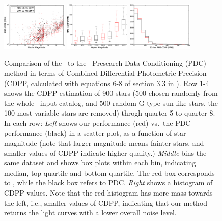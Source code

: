 \begin{figure}[p]
\begin{center}
\includegraphics[width=0.28\textwidth]{figures/cpm/f6j}
\includegraphics[width=0.28\textwidth]{figures/cpm/f6k}
\includegraphics[width=0.28\textwidth]{figures/cpm/f6l}
\end{center}
\caption[The \name\ photometric precisson]{
  \label{cdpp} 
  Comparison of the \name\ to the \Kepler\ Presearch Data Conditioning (PDC) method in terms of Combined Differential Photometric Precision (CDPP, calculated with equations 6-8 of section 3.3 in \citealt{cdpp1}).
  Row 1-4 shows the CDPP estimation of 900 stars (500 chosen randomly from the whole \Kepler\ input catalog, and 500 random G-type sun-like stars, the 100 most variable stars are removed) throgh quarter 5 to quarter 8. In each row:
  \emph{Left} shows our performance (red) vs.\ the PDC performance (black) in a scatter plot, as a function of star magnitude (note that larger magnitude means fainter stars, and smaller values of CDPP indicate higher quality.)
  \emph{Middle} bins the same dataset and shows box plots within each bin, indicating median, top quartile and bottom quartile. 
  The red box corresponds to \name, while the black box refers to PDC. 
  \emph{Right} shows a histogram of CDPP values. 
  Note that the red histogram has more mass towards the left, i.e., smaller values of CDPP, 
    indicating that our method returns the light curves with a lower overall noise level.
}
\end{figure}

